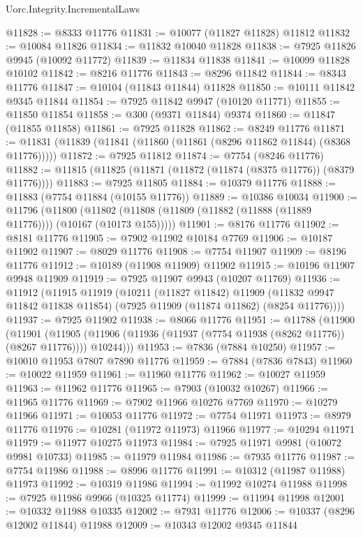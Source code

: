\begin{lexlean}{Uorc.Integrity.IncrementalLaws}
\begin{coremodule}
@11828 := @8333 @11776
@11831 := @10077 (@11827 @11828) @11812
@11832 := @10084 @11826
@11834 := @11832 @10040 @11828
@11838 := @7925 @11826 @9945 (@10092 @11772)
@11839 := @11834 @11838
@11841 := @10099 @11828 @10102
@11842 := @8216 @11776
@11843 := @8296 @11842
@11844 := @8343 @11776
@11847 := @10104 (@11843 @11844) @11828
@11850 := @10111 @11842 @9345 @11844
@11854 := @7925 @11842 @9947 (@10120 @11771)
@11855 := @11850 @11854
@11858 := @300 (@9371 @11844) @9374
@11860 := @11847 (@11855 @11858)
@11861 := @7925 @11828
@11862 := @8249 @11776
@11871 := @11831 (@11839 (@11841 (@11860 (@11861 (@8296 @11862 @11844) (@8368 @11776)))))
@11872 := @7925 @11812
@11874 := @7754 (@8246 @11776)
@11882 := @11815 (@11825 (@11871 (@11872 (@11874 (@8375 @11776)) (@8379 @11776))))
@11883 := @7925 @11805
@11884 := @10379 @11776
@11888 := @11883 (@7754 @11884 (@10155 @11776))
@11889 := @10386 @10034
@11900 := @11796
    (@11800 (@11802 (@11808 (@11809 (@11882 (@11888 (@11889 @11776)))) (@10167 (@10173 @155)))))
@11901 := @8176 @11776
@11902 := @8181 @11776
@11905 := @7902 @11902 @10184 @7769
@11906 := @10187 @11902
@11907 := @8029 @11776
@11908 := @7754 @11907
@11909 := @8196 @11776
@11912 := @10189 (@11908 @11909) @11902
@11915 := @10196 @11907 @9948 @11909
@11919 := @7925 @11907 @9943 (@10207 @11769)
@11936 := @11912
    (@11915
      @11919
      (@10211
        (@11827 @11842)
        @11909
        (@11832 @9947 @11842 @11838 @11854)
        (@7925 @11909 (@11874 @11862) (@8254 @11776))))
@11937 := @7925 @11902
@11938 := @8066 @11776
@11951 := @11788
    (@11900
      (@11901
        (@11905 (@11906 (@11936 (@11937 (@7754 @11938 (@8262 @11776)) (@8267 @11776)))) @10244)))
@11953 := @7836 (@7884 @10250)
@11957 := @10010 @11953 @7807 @7890 @11776
@11959 := @7884 (@7836 @7843)
@11960 := @10022 @11959
@11961 := @11960 @11776
@11962 := @10027 @11959
@11963 := @11962 @11776
@11965 := @7903 (@10032 @10267)
@11966 := @11965 @11776
@11969 := @7902 @11966 @10276 @7769
@11970 := @10279 @11966
@11971 := @10053 @11776
@11972 := @7754 @11971
@11973 := @8979 @11776
@11976 := @10281 (@11972 @11973) @11966
@11977 := @10294 @11971
@11979 := @11977 @10275 @11973
@11984 := @7925 @11971 @9981 (@10072 @9981 @10733)
@11985 := @11979 @11984
@11986 := @7935 @11776
@11987 := @7754 @11986
@11988 := @8996 @11776
@11991 := @10312 (@11987 @11988) @11973
@11992 := @10319 @11986
@11994 := @11992 @10274 @11988
@11998 := @7925 @11986 @9966 (@10325 @11774)
@11999 := @11994 @11998
@12001 := @10332 @11988 @10335
@12002 := @7931 @11776
@12006 := @10337 (@8296 @12002 @11844) @11988
@12009 := @10343 @12002 @9345 @11844

\end{coremodule}
\end{lexlean}
